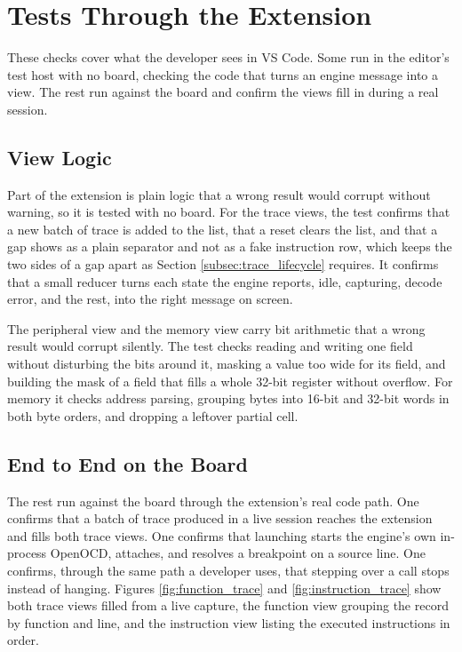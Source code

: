 \section{Tests Through the Extension}
\label{sec:frontend_tier}
These checks cover what the developer sees in VS Code. Some run in the editor's test host with no board, checking the code that turns an engine message into a view. The rest run against the board and confirm the views fill in during a real session.

\subsection{View Logic}
Part of the extension is plain logic that a wrong result would corrupt without warning, so it is tested with no board. For the trace views, the test confirms that a new batch of trace is added to the list, that a reset clears the list, and that a gap shows as a plain separator and not as a fake instruction row, which keeps the two sides of a gap apart as Section \ref{subsec:trace_lifecycle} requires. It confirms that a small reducer turns each state the engine reports, idle, capturing, decode error, and the rest, into the right message on screen.

The peripheral view and the memory view carry bit arithmetic that a wrong result would corrupt silently. The test checks reading and writing one field without disturbing the bits around it, masking a value too wide for its field, and building the mask of a field that fills a whole 32-bit register without overflow. For memory it checks address parsing, grouping bytes into 16-bit and 32-bit words in both byte orders, and dropping a leftover partial cell.

\subsection{End to End on the Board}
The rest run against the board through the extension's real code path. One confirms that a batch of trace produced in a live session reaches the extension and fills both trace views. One confirms that launching starts the engine's own in-process OpenOCD, attaches, and resolves a breakpoint on a source line. One confirms, through the same path a developer uses, that stepping over a call stops instead of hanging. Figures \ref{fig:function_trace} and \ref{fig:instruction_trace} show both trace views filled from a live capture, the function view grouping the record by function and line, and the instruction view listing the executed instructions in order.

